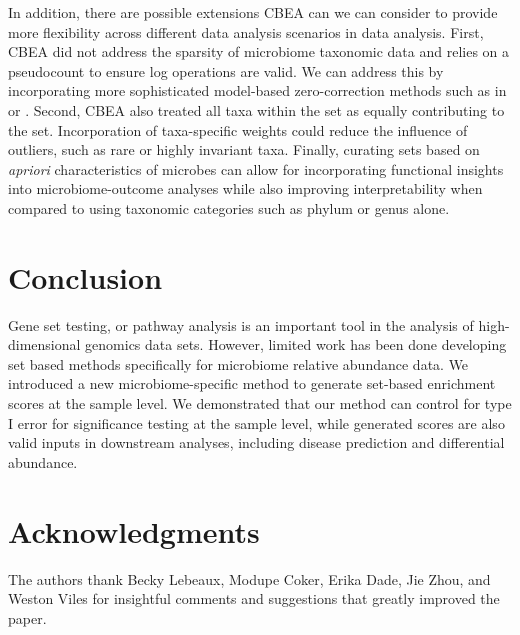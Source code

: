 \documentclass[10pt,letterpaper]{article}
\begin{document}
In addition, there are possible extensions CBEA can we can consider to provide more flexibility across different data analysis scenarios in data analysis. First, CBEA did not address the sparsity of microbiome taxonomic data and relies on a pseudocount to ensure log operations are valid. We can address this by incorporating more sophisticated model-based zero-correction methods such as in \cite{martin-fernandez2012} or \cite{kaul2017a}. Second, CBEA also treated all taxa within the set as equally contributing to the set. Incorporation of taxa-specific weights could reduce the influence of outliers, such as rare or highly invariant taxa. Finally, curating sets based on \emph{apriori} characteristics of microbes can allow for incorporating functional insights into microbiome-outcome analyses while also improving interpretability when compared to using taxonomic categories such as phylum or genus alone.  

\section*{Conclusion}
Gene set testing, or pathway analysis is an important tool in the analysis of high-dimensional genomics data sets. However, limited work has been done developing set based methods specifically for microbiome relative abundance data. We introduced a new microbiome-specific method to generate set-based enrichment scores at the sample level. We demonstrated that our method can control for type I error for significance testing at the sample level, while generated scores are also valid inputs in downstream analyses, including disease prediction and differential abundance.  

\section*{Acknowledgments}
The authors thank Becky Lebeaux, Modupe Coker, Erika Dade, Jie Zhou, and Weston Viles for insightful comments and suggestions that greatly improved the paper. 

\nolinenumbers
%
%
% 
\end{document}

